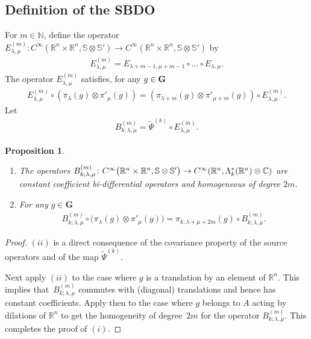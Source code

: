 \documentclass[pdftex]{sigma}
\numberwithin{equation}{section}
\newtheorem{prop}[theor]{Proposition}
\begin{document}
\subsection{Definition of the SBDO}
For $m\in \mathbb N$, define the operator $E_{\lambda, \mu}^{(m)} \colon C^\infty(\mathbb R^n \times \mathbb R^n, \mathbb S\otimes \mathbb S')\to C^\infty(\mathbb R^n \times \mathbb R^n, \mathbb S\otimes \mathbb S')$ by
\begin{gather*}
E_{\lambda, \mu}^{(m)}=E_{\lambda+m-1, \mu+m-1}\circ \dots \circ E_{\lambda, \mu}.
\end{gather*}
The operator $E_{\lambda, \mu}^{(m)}$ satisfies, for any $g\in \bf G$
\begin{gather}\label{covEm}
E_{\lambda, \mu}^{(m)}\circ \left(\pi_\lambda(g) \otimes \pi'_\mu(g) \right)= \left(\pi_{\lambda+m}(g) \otimes \pi'_{\mu+m}(g)\right)\circ E_{\lambda, \mu}^{(m)}.
\end{gather}
Let
\begin{gather*}
B_{k;\lambda, \mu}^{(m)}= \widetilde \Psi^{(k)} \circ E_{\lambda, \mu}^{(m)}.
\end{gather*}

\begin{prop} \quad
\begin{enumerate}\itemsep=0pt
\item[$(i)$] The operators $B_{k;\lambda, \mu}^{(m)} \colon C^\infty\big(\mathbb R^n\times \mathbb R^n, \mathbb S\otimes \mathbb S'\big)\rightarrow C^\infty(\mathbb R^n, \Lambda^*_k(\mathbb R^n)\otimes \nobreak \mathbb C)$ are constant coefficient bi-differential operators and homogeneous of degree $2m$.

\item[$(ii)$] For any $g\in \mathbf G$
\begin{gather*}
B_{k;\lambda, \mu}^{(m)}\circ \big(\pi_\lambda(g) \otimes \pi'_\mu(g)\big)= \pi_{k;\lambda+\mu+2m}(g)\circ B_{k;\lambda, \mu}^{(m)}.
\end{gather*}
\end{enumerate}
\end{prop}
\begin{proof}
$(ii)$ is a direct consequence of the covariance property of the source operators and of the map $\widetilde \Psi^{(k)}$.

Next apply $(ii)$ to the case where $g$ is a translation by an element of $\mathbb R^n$. This implies that~$B^{(m)}_{k;\lambda,\mu}$ commutes with (diagonal) translations and hence has constant coefficients. Apply then to the case where $g$ belongs to $A$ acting by dilations of $\mathbb R^n$ to get the homogeneity of degree~$2m$ for the operator $B^{(m)}_{k;\lambda,\mu}$. This completes the proof of $(i)$.
\end{proof}
\end{document}
